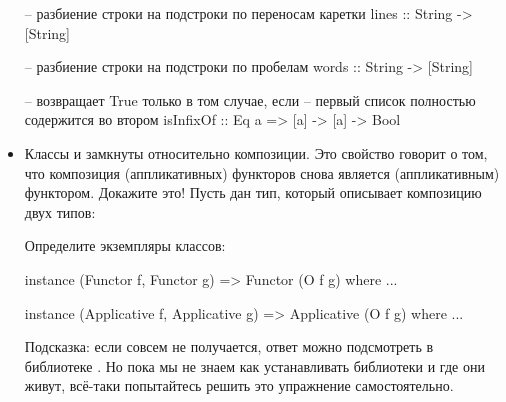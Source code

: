 \begin{itemize}
\begin{code}
-- разбиение строки на подстроки по переносам каретки
lines :: String -> [String]

-- разбиение строки на подстроки по пробелам
words :: String -> [String]

-- возвращает True только в том случае, если 
-- первый список полностью содержится во втором
isInfixOf :: Eq a => [a] -> [a] -> Bool
\end{code}


\item Классы  и  замкнуты относительно композиции. 
    Это свойство говорит о том, что композиция (аппликативных) функторов
    снова является (аппликативным) функтором. Докажите это!
    Пусть дан тип, который описывает композицию двух типов:

\begin{code}
newtype O f g a = O { unO :: f (g a)
\end{code}

    Определите экземпляры классов:

\begin{code}
instance (Functor f, Functor g) => Functor (O f g) where ...

instance (Applicative f, Applicative g) => Applicative (O f g) where ...
\end{code}

    Подсказка: если совсем не получается, ответ можно подсмотреть
    в библиотеке . Но пока мы не знаем как 
    устанавливать библиотеки и где они живут, всё-таки попытайтесь
    решить это упражнение самостоятельно.

\end{itemize}



